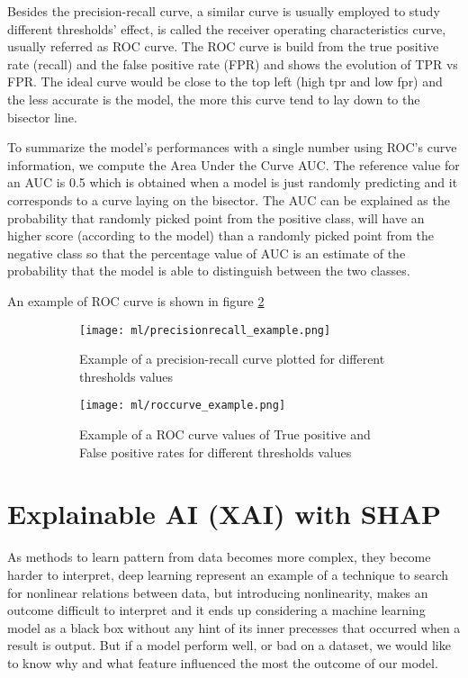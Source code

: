 \documentclass[11pt]{report}
\begin{document}
Besides the precision-recall curve, a similar curve is usually employed to study different thresholds' effect, is called the receiver operating characteristics curve, usually referred as ROC curve.
The ROC curve is build from the true positive rate (recall) and the false positive rate (FPR) and shows the evolution of TPR vs FPR.
The ideal curve would be close to the top left (high tpr and low fpr) and the less accurate is the model, the more this curve tend to lay down to the bisector line.

To summarize the model's performances with a single number using ROC's curve information, we compute the Area Under the Curve AUC.
The reference value for an AUC is 0.5 which is obtained when a model is just randomly predicting and it corresponds to a curve laying on the bisector.
The AUC can be explained as the probability that randomly picked point from the positive class, will have an higher score (according to the model) than a randomly picked point from the negative class so that the percentage value of AUC is an estimate of the probability that the model is able to distinguish between the two classes.

An example of ROC curve is shown in figure \ref{fig:roccurve}


\begin{figure}
\centering
\begin{subfigure}{0.4\textwidth}
\texttt{[image: ml/precisionrecall\_example.png]}
\caption{Example of a precision-recall curve plotted for different thresholds values}
\label{fig:precisionrecall}
\end{subfigure}
\begin{subfigure}{0.4\textwidth}
\texttt{[image: ml/roccurve\_example.png]}
\caption{Example of a ROC curve values of True positive and False positive rates for different thresholds values}
\label{fig:roccurve}
\end{subfigure}
\caption{}
\label{}
\end{figure}



\chapter{Explainable AI (XAI) with SHAP}

As methods to learn pattern from data becomes more complex, they become harder to interpret, deep learning represent an example of a technique to search for nonlinear relations between data, but introducing nonlinearity, makes an outcome difficult to interpret and it ends up considering a machine learning model as a black box without any hint of its inner precesses that occurred when a result is output. But if a model perform well, or bad on a dataset, we would like to know why and what feature influenced the most the outcome of our model.
\end{document}

